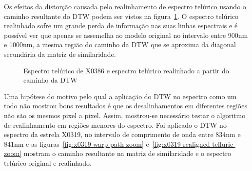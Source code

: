 Os efeitos da distorção causada pelo realinhamento de espectro telúrico usando o caminho resultante do DTW podem ser vistos na figura~\ref{fig:x0386-realigned-telluric}. O espectro telúrico realinhado sofre um grande perda de informação nas suas linhas espectrais e é possível ver que apenas se assemelha ao modelo original no intervalo entre 900nm e 1000nm, a mesma região do caminho da DTW que se aproxima da diagonal secundária da matriz de similaridade.

\begin{figure}[H]
  \centering
  \hfill
  \caption{Espectro telúrico de X0386 e espectro telúrico realinhado a partir do caminho da DTW}
  \label{fig:x0386-realigned-telluric}
\end{figure}


Uma hipótese do motivo pelo qual a aplicação do DTW no espectro como um todo não mostrou bons resultados é que os desalinhamentos em diferentes regiões não são os mesmos pixel a pixel. Assim, mostrou-se necessário testar o algoritmo de realinhamento em regiões menores do espectro. Foi aplicado o DTW no espectro da estrela X0319, no intervalo de comprimento de onda entre 834nm e 841nm e as figuras~\ref{fig:x0319-warp-path-zoom} e~\ref{fig:x0319-realigned-telluric-zoom} mostram o caminho resultante na matriz de similaridade e o espectro telúrico original e realinhado. 

